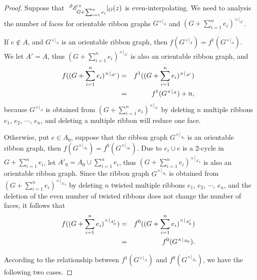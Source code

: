 \begin{proof}
 Suppose that $~^{\partial}{{\mathscr{E}}}^{\times}_{G+\sum ^{n}_{i=1}e_{i}}|_O(z)$  is even-interpolating. We  need  to analysis the number of     faces for orientable ribbon graphs $G^{\times|_{A}}$ and $(G+\sum ^{n}_{i=1}e_{i})^{\times|_{A'}}$.

 If $e\notin A$,  and $G^{\times|_{A}}$ is an orientable ribbon graph, then $f(G^{\times|_{A}})=f^{1}(G^{\times|_{A}})$.  We let $A'=A$, thus $(G+\sum ^{n}_{i=1}e_{i})^{\times|_{A'}}$ is also an orientable ribbon graph,  and
 \begin{eqnarray}
f((G+\sum ^{n}_{i=1}e_{i})^{\times|_{A'}})&=&f^{1}((G+\sum ^{n}_{i=1}e_{i})^{\times|_{A'}})\notag\\
 &=&f^{1}(G^{\times|_{A}})+n,\label{A.0}
\end{eqnarray}
   because $G^{\times|_{A}}$ is  obtained  from $ (G+\sum ^{n}_{i=1}e_{i})^{\times|_{A'}} $ by deleting  $n$ multiple ribbons $e_{1}$, $e_{2}$, $\cdots$,  $e_{n}$, and deleting a multiple ribbon will reduce one face.


Otherwise, put $e\in A_{0}$,  suppose that the ribbon graph $G^{\times|_{A_{0}}}$ is an orientable  ribbon graph, then  $f(G^{\times|_{A_{0}}})=f^{0}(G^{\times|_{A_{0}}})$.   Due to $e_i \cup e$ is a 2-cycle in $G+\sum ^{n}_{i=1}e_{i}$,  let $A'_{0}=A_{0}\cup\sum ^{n}_{i=1}e_{i}$,   thus $ (G+\sum ^{n}_{i=1}e_{i})^{\times|_{A'_{0}}}$ is also an orientable ribbon graph.  Since the ribbon graph $G^{\times|_{A_{0}}}$ is  obtained  from  $(G+\sum ^{n}_{i=1}e_{i})^{\times|_{A'_{0}}}$  by deleting $n$ twisted multiple ribbons  $e_{1}$, $e_{2}$, $\cdots$,  $e_{n}$, and the deletion of the even number of  twisted ribbons   does not change the number of faces, it follows that
 \begin{eqnarray}
f((G+\sum ^{n}_{i=1}e_{i})^{\times|_{A'_{0}}}) &=&f^{0}((G+\sum ^{n}_{i=1}e_{i})^{\times|_{A'_{0}}})\notag\\
&=& f^{0}(G^{\times|_{A_{0}}}).\label{A.1}
\end{eqnarray}


According to the relationship between $f^{1}(G^{\times|_{A}})$ and $f^{0}(G^{\times|_{A_{0}}}) $, we have the following two cases.


\end{proof}
